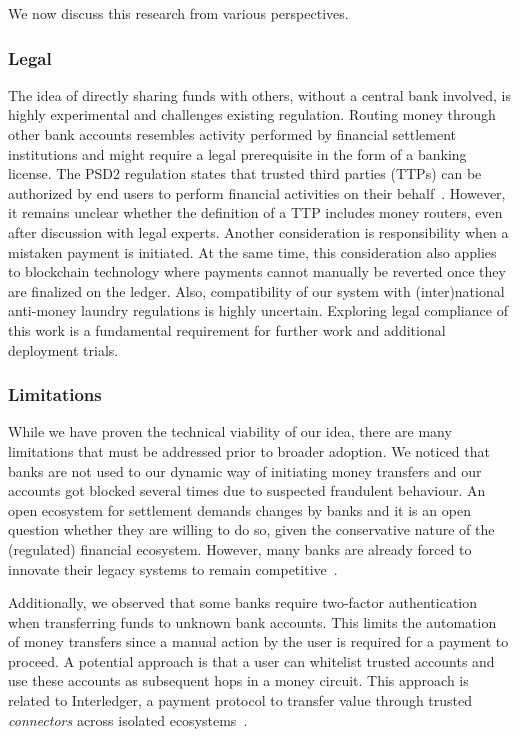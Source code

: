 We now discuss this research from various perspectives.

\subsubsection*{Legal}
The idea of directly sharing funds with others, without a central bank involved, is highly experimental and challenges existing regulation.
Routing money through other bank accounts resembles activity performed by financial settlement institutions and might require a legal prerequisite in the form of a banking license.
The PSD2 regulation states that trusted third parties (TTPs) can be authorized by end users to perform financial activities on their behalf~\cite{cortet2016psd2}.
However, it remains unclear whether the definition of a TTP includes money routers, even after discussion with legal experts.
Another consideration is responsibility when a mistaken payment is initiated.
At the same time, this consideration also applies to blockchain technology where payments cannot manually be reverted once they are finalized on the ledger.
Also, compatibility of our system with (inter)national anti-money laundry regulations is highly uncertain.
Exploring legal compliance of this work is a fundamental requirement for further work and additional deployment trials.

\subsubsection*{Limitations}
While we have proven the technical viability of our idea, there are many limitations that must be addressed prior to broader adoption.
We noticed that banks are not used to our dynamic way of initiating money transfers and our accounts got blocked several times due to suspected fraudulent behaviour.
An open ecosystem for settlement demands changes by banks and it is an open question whether they are willing to do so, given the conservative nature of the (regulated) financial ecosystem.
However, many banks are already forced to innovate their legacy systems to remain competitive~\cite{mckinsey2016payments}.

Additionally, we observed that some banks require two-factor authentication when transferring funds to unknown bank accounts.
This limits the automation of money transfers since a manual action by the user is required for a payment to proceed.
A potential approach is that a user can whitelist trusted accounts and use these accounts as subsequent hops in a money circuit.
This approach is related to Interledger, a payment protocol to transfer value through trusted \emph{connectors} across isolated ecosystems~\cite{thomas2015protocol}.

